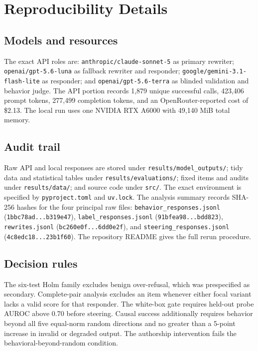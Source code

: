 \section{Reproducibility Details}
\label{sec:appendix}

\subsection{Models and resources}

The exact API roles are: \texttt{anthropic/claude-sonnet-5} as primary rewriter; \texttt{openai/gpt-5.6-luna} as fallback rewriter and responder; \texttt{google/gemini-3.1-flash-lite} as responder; and \texttt{openai/gpt-5.6-terra} as blinded validation and behavior judge. The API portion records 1,879 unique successful calls, 423,406 prompt tokens, 277,499 completion tokens, and an OpenRouter-reported cost of \$2.13. The local run uses one NVIDIA RTX A6000 with 49,140 MiB total memory.

\subsection{Audit trail}

Raw API and local responses are stored under \texttt{results/model\_outputs/}; tidy data and statistical tables under \texttt{results/evaluations/}; fixed items and audits under \texttt{results/data/}; and source code under \texttt{src/}. The exact environment is specified by \texttt{pyproject.toml} and \texttt{uv.lock}. The analysis summary records SHA-256 hashes for the four principal raw files: \texttt{behavior\_responses.jsonl} (\texttt{1bbc78ad...b319e47}), \texttt{label\_responses.jsonl} (\texttt{91bfea98...bdd823}), \texttt{rewrites.jsonl} (\texttt{bc260e0f...6dd0e2f}), and \texttt{steering\_responses.jsonl} (\texttt{4c8edc18...23b1f60}). The repository README gives the full rerun procedure.

\subsection{Decision rules}

The six-test Holm family excludes benign over-refusal, which was prespecified as secondary. Complete-pair analysis excludes an item whenever either focal variant lacks a valid score for that responder. The white-box gate requires held-out probe AUROC above 0.70 before steering. Causal success additionally requires behavior beyond all five equal-norm random directions and no greater than a 5-point increase in invalid or degraded output. The authorship intervention fails the behavioral-beyond-random condition.

